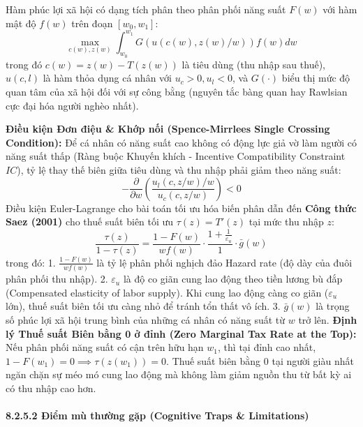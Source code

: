 \documentclass[
]{article}
\begin{document}
Hàm phúc lợi xã hội có dạng tích phân theo phân phối năng suất \(F(w)\)
với hàm mật độ \(f(w)\) trên đoạn \([w_0, w_1]\):
\[\max_{c(w), z(w)} \int_{w_0}^{w_1} G(u(c(w), z(w)/w)) f(w) dw\] trong
đó \(c(w) = z(w) - T(z(w))\) là tiêu dùng (thu nhập sau thuế),
\(u(c, l)\) là hàm thỏa dụng cá nhân với \(u_c > 0, u_l < 0\), và
\(G(\cdot)\) biểu thị mức độ quan tâm của xã hội đối với sự công bằng
(nguyên tắc bàng quan hay Rawlsian cực đại hóa người nghèo nhất).

\textbf{Điều kiện Đơn điệu \& Khớp nối (Spence-Mirrlees Single Crossing
Condition):} Để cá nhân có năng suất cao không có động lực giả vờ làm
người có năng suất thấp (Ràng buộc Khuyến khích - Incentive
Compatibility Constraint \(IC\)), tỷ lệ thay thế biên giữa tiêu dùng và
thu nhập phải giảm theo năng suất:
\[-\frac{\partial}{\partial w} \left( \frac{u_l(c, z/w) / w}{u_c(c, z/w)} \right) < 0\]
Điều kiện Euler-Lagrange cho bài toán tối ưu hóa biến phân dẫn đến
\textbf{Công thức Saez (2001)} cho thuế suất biên tối ưu
\(\tau(z) = T'(z)\) tại mức thu nhập \(z\):
\[\frac{\tau(z)}{1 - \tau(z)} = \frac{1 - F(w)}{w f(w)} \cdot \frac{1 + \frac{1}{\varepsilon_u}}{1} \cdot \bar{g}(w)\]
trong đó: 1. \(\frac{1 - F(w)}{w f(w)}\) là tỷ lệ phân phối nghịch đảo
Hazard rate (độ dày của đuôi phân phối thu nhập). 2. \(\varepsilon_u\)
là độ co giãn cung lao động theo tiền lương bù đắp (Compensated
elasticity of labor supply). Khi cung lao động càng co giãn
(\(\varepsilon_u\) lớn), thuế suất biên tối ưu càng nhỏ để tránh tổn
thất vô ích. 3. \(\bar{g}(w)\) là trọng số phúc lợi xã hội trung bình
của những cá nhân có năng suất từ \(w\) trở lên. \textbf{Định lý Thuế
suất Biên bằng 0 ở đỉnh (Zero Marginal Tax Rate at the Top):} Nếu phân
phối năng suất có cận trên hữu hạn \(w_1\), thì tại đỉnh cao nhất,
\(1 - F(w_1) = 0 \implies \tau(z(w_1)) = 0\). Thuế suất biên bằng 0 tại
người giàu nhất ngăn chặn sự méo mó cung lao động mà không làm giảm
nguồn thu từ bất kỳ ai có thu nhập cao hơn.

\paragraph{8.2.5.2 Điểm mù thường gặp (Cognitive Traps \&
Limitations)}\label{ux111iux1ec3m-muxf9-thux1b0ux1eddng-gux1eb7p-cognitive-traps-limitations-53}
\end{document}
